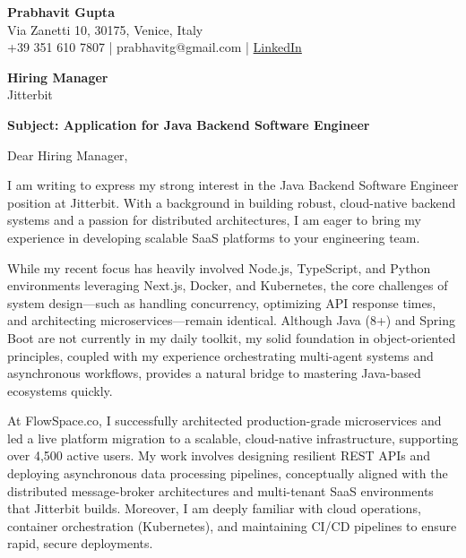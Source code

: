 \documentclass[11pt,a4paper]{article}
\begin{document}
\thispagestyle{empty}

\noindent
\textbf{Prabhavit Gupta}\\
Via Zanetti 10, 30175, Venice, Italy\\
+39 351 610 7807 | prabhavitg@gmail.com | \href{https://www.linkedin.com/in/prabhavit/}{LinkedIn}

\vspace{2em}

\noindent
\textbf{Hiring Manager}\\
Jitterbit\\

\vspace{1em}

\noindent
\textbf{Subject: Application for Java Backend Software Engineer}

\vspace{1em}

\noindent
Dear Hiring Manager,

\vspace{1em}
\noindent
I am writing to express my strong interest in the Java Backend Software Engineer position at Jitterbit. With a background in building robust, cloud-native backend systems and a passion for distributed architectures, I am eager to bring my experience in developing scalable SaaS platforms to your engineering team. 

\vspace{1em}
\noindent
While my recent focus has heavily involved Node.js, TypeScript, and Python environments leveraging Next.js, Docker, and Kubernetes, the core challenges of system design—such as handling concurrency, optimizing API response times, and architecting microservices—remain identical. Although Java (8+) and Spring Boot are not currently in my daily toolkit, my solid foundation in object-oriented principles, coupled with my experience orchestrating multi-agent systems and asynchronous workflows, provides a natural bridge to mastering Java-based ecosystems quickly.

\vspace{1em}
\noindent
At FlowSpace.co, I successfully architected production-grade microservices and led a live platform migration to a scalable, cloud-native infrastructure, supporting over 4,500 active users. My work involves designing resilient REST APIs and deploying asynchronous data processing pipelines, conceptually aligned with the distributed message-broker architectures and multi-tenant SaaS environments that Jitterbit builds. Moreover, I am deeply familiar with cloud operations, container orchestration (Kubernetes), and maintaining CI/CD pipelines to ensure rapid, secure deployments.
\end{document}
